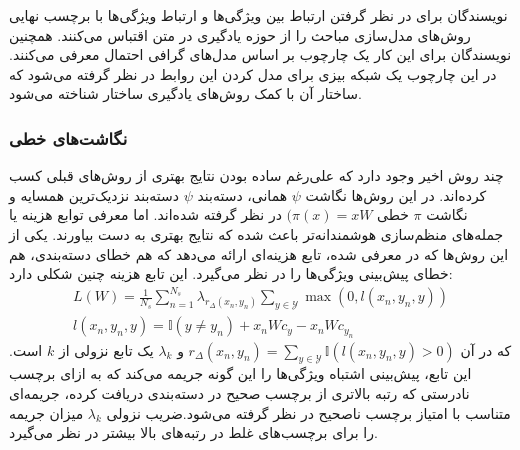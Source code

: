 نویسندگان \cite{ topicmodel} برای در نظر گرفتن ارتباط بین ویژگی‌ها و ارتباط ویژگی‌ها با برچسب نهایی روش‌های مدل‌سازی مباحث را از حوزه یادگیری در متن اقتباس می‌کنند. همچنین  نویسندگان \cite{ unified13} برای این کار یک چارچوب بر اساس مدل‌های گرافی احتمال معرفی می‌کنند. در این چارچوب یک شبکه بیزی  برای مدل کردن این روابط در نظر گرفته می‌شود که ساختار آن با کمک روش‌های یادگیری ساختار 
شناخته می‌شود. 

\subsubsection{نگاشت‌های خطی}\label{linear}
چند روش اخیر وجود دارد که علی‌رغم ساده بودن نتایج بهتری از روش‌های قبلی کسب کرده‌اند. در این روش‌ها  نگاشت $\psi$ همانی، دسته‌بند $\psi$ دسته‌بند نزدیک‌ترین همسایه و نگاشت $\pi$ خطی $(\pi(x) = xW$ در نظر گرفته شده‌اند. اما معرفی توابع هزینه یا جمله‌های منظم‌سازی 
هوشمندانه‌تر باعث شده که نتایج بهتری به دست بیاورند. یکی از این روش‌ها که در \cite{ akata13} معرفی شده، تابع هزینه‌ای ارائه می‌دهد که هم خطای دسته‌بندی، هم خطای پیش‌بینی ویژگی‌ها را در نظر می‌گیرد. این تابع هزینه چنین شکلی دارد:
\begin{align}
L(W) = \frac{1}{N_s} \sum_{n=1}^{N_s} \lambda_{r_\Delta (x_n, y_n)} \sum_{y \in \mathcal{Y}} \max (0, \mathit{l}(x_n, y_n, y) ) \\
\mathit{l}(x_n,y_n,y) = \mathbb{I}(y \neq y_n) + x_nWc_y - x_nWc_{y_n}
\end{align}
که در آن $ r_\Delta (x_n, y_n) =  \sum_{y \in \mathcal{Y}} \mathbb{I}(\mathit{l}(x_n, y_n, y)  > 0) $ و $\lambda_k$ یک تابع نزولی از $k$ است. این تابع، پیش‌بینی اشتباه ویژگی‌ها را  این گونه جریمه می‌کند که به ازای برچسب نادرستی که رتبه بالاتری از برچسب صحیح در دسته‌بندی دریافت کرده، جریمه‌ای متناسب با امتیاز برچسب ناصحیح در نظر گرفته می‌شود.ضریب نزولی $\lambda_k$ میزان جریمه را برای برچسب‌های غلط در رتبه‌های بالا بیشتر در نظر می‌گیرد.

